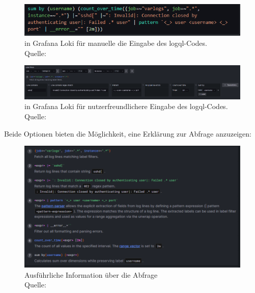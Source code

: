 \begin{figure}[H]
   \centering
   \includegraphics[width=1\textwidth]{assets/manuellerCodeLoki.png}
   \caption{ in Grafana Loki für manuelle die Eingabe des \gls{logql}-Codes. \\ Quelle: \citep{VoidQuark_sshlogs}}
   \centering
\end{figure}

\begin{figure}[H]
   \centering
   \includegraphics[width=1\textwidth]{assets/klickibuntyGrafana.png}
   \caption{ in Grafana Loki für nutzerfreundlichere Eingabe des \gls{logql}-Codes. Quelle: \citep{VoidQuark_sshlogs}}
   \centering
\end{figure}

Beide Optionen bieten die Möglichkeit, eine Erklärung zur Abfrage anzuzeigen:
\begin{figure}[H]
   \centering
   \includegraphics[width=1\textwidth]{assets/erklaerungLoki.png}
   \caption{Ausführliche Information über die Abfrage\\Quelle: \citep{Grafana_QueryEditor}}
   \centering
\end{figure}

